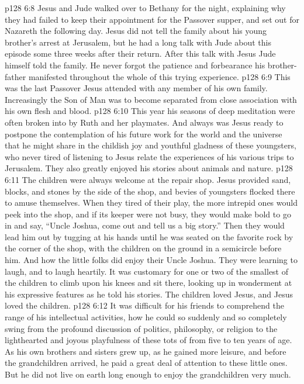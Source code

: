 \vs p128 6:8 Jesus and Jude walked over to Bethany for the night, explaining why they had failed to keep their appointment for the Passover supper, and set out for Nazareth the following day. Jesus did not tell the family about his young brother’s arrest at Jerusalem, but he had a long talk with Jude about this episode some three weeks after their return. After this talk with Jesus Jude himself told the family. He never forgot the patience and forbearance his brother\hyp{}father manifested throughout the whole of this trying experience.
\vs p128 6:9 This was the last Passover Jesus attended with any member of his own family. Increasingly the Son of Man was to become separated from close association with his own flesh and blood.
\pc \vs p128 6:10 This year his seasons of deep meditation were often broken into by Ruth and her playmates. And always was Jesus ready to postpone the contemplation of his future work for the world and the universe that he might share in the childish joy and youthful gladness of these youngsters, who never tired of listening to Jesus relate the experiences of his various trips to Jerusalem. They also greatly enjoyed his stories about animals and nature.
\vs p128 6:11 The children were always welcome at the repair shop. Jesus provided sand, blocks, and stones by the side of the shop, and bevies of youngsters flocked there to amuse themselves. When they tired of their play, the more intrepid ones would peek into the shop, and if its keeper were not busy, they would make bold to go in and say, “Uncle Joshua, come out and tell us a big story.” Then they would lead him out by tugging at his hands until he was seated on the favorite rock by the corner of the shop, with the children on the ground in a semicircle before him. And how the little folks did enjoy their Uncle Joshua. They were learning to laugh, and to laugh heartily. It was customary for one or two of the smallest of the children to climb upon his knees and sit there, looking up in wonderment at his expressive features as he told his stories. The children loved Jesus, and Jesus loved the children.
\vs p128 6:12 It was difficult for his friends to comprehend the range of his intellectual activities, how he could so suddenly and so completely swing from the profound discussion of politics, philosophy, or religion to the lighthearted and joyous playfulness of these tots of from five to ten years of age. As his own brothers and sisters grew up, as he gained more leisure, and before the grandchildren arrived, he paid a great deal of attention to these little ones. But he did not live on earth long enough to enjoy the grandchildren very much.
